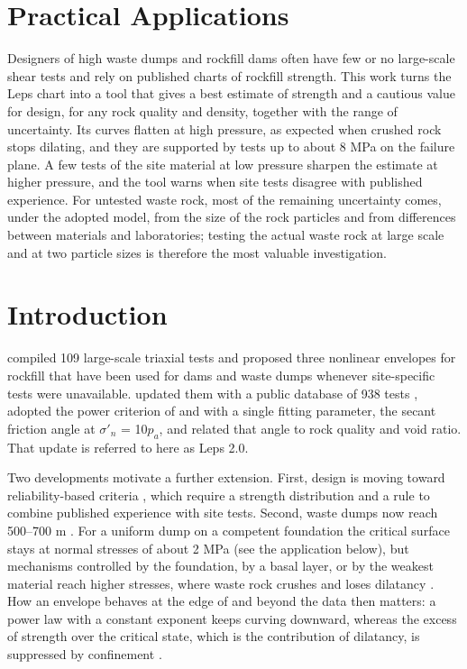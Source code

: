 \documentclass[Journal,letterpaper]{ascelike-new}
\begin{document}
\section{Practical Applications}
\noindent Designers of high waste dumps and rockfill dams often have few or no large-scale shear tests and rely on published charts of rockfill strength. This work turns the Leps chart into a tool that gives a best estimate of strength and a cautious value for design, for any rock quality and density, together with the range of uncertainty. Its curves flatten at high pressure, as expected when crushed rock stops dilating, and they are supported by tests up to about 8 MPa on the failure plane. A few tests of the site material at low pressure sharpen the estimate at higher pressure, and the tool warns when site tests disagree with published experience. For untested waste rock, most of the remaining uncertainty comes, under the adopted model, from the size of the rock particles and from differences between materials and laboratories; testing the actual waste rock at large scale and at two particle sizes is therefore the most valuable investigation.


\section{Introduction}
 compiled 109 large-scale triaxial tests and proposed three nonlinear envelopes for rockfill that have been used for dams and waste dumps whenever site-specific tests were unavailable.  updated them with a public database of 938 tests \cite{arrieta2025}, adopted the power criterion of  and  with a single fitting parameter, the secant friction angle at $\sigma'_n$ = 10$p_a$, and related that angle to rock quality and void ratio. That update is referred to here as Leps 2.0.

Two developments motivate a further extension. First, design is moving toward reliability-based criteria \cite{read2009,hawley2017}, which require a strength distribution and a rule to combine published experience with site tests. Second, waste dumps now reach 500--700 m \cite{valenzuela2008}. For a uniform dump on a competent foundation the critical surface stays at normal stresses of about 2 MPa (see the application below), but mechanisms controlled by the foundation, by a basal layer, or by the weakest material reach higher stresses, where waste rock crushes and loses dilatancy \cite{marsal1973,hardin1985,lade1996,linero2007,ovalle2020}. How an envelope behaves at the edge of and beyond the data then matters: a power law with a constant exponent keeps curving downward, whereas the excess of strength over the critical state, which is the contribution of dilatancy, is suppressed by confinement \cite{bolton1986,jefferies2016}.
\end{document}
